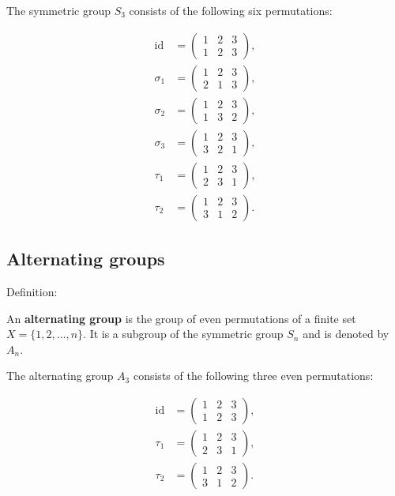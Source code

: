 \begin{example}
  The symmetric group $S_3$ consists of the following six permutations:

  \begin{align*}
    \text{id} &= \begin{pmatrix} 1 & 2 & 3 \\ 1 & 2 & 3 \end{pmatrix}, \\
    \sigma_1 &= \begin{pmatrix} 1 & 2 & 3 \\ 2 & 1 & 3 \end{pmatrix}, \\
    \sigma_2 &= \begin{pmatrix} 1 & 2 & 3 \\ 1 & 3 & 2 \end{pmatrix}, \\
    \sigma_3 &= \begin{pmatrix} 1 & 2 & 3 \\ 3 & 2 & 1 \end{pmatrix}, \\
    \tau_1 &= \begin{pmatrix} 1 & 2 & 3 \\ 2 & 3 & 1 \end{pmatrix}, \\
    \tau_2 &= \begin{pmatrix} 1 & 2 & 3 \\ 3 & 1 & 2 \end{pmatrix}.
  \end{align*}
\end{example}

\subsection{Alternating groups}

Definition:

  An \textbf{alternating group} is the group of even permutations of a finite set $X = \{1, 2, \dots, n\}$. It is a subgroup of the symmetric group $S_n$ and is denoted by $A_n$.

\begin{example}
  The alternating group $A_3$ consists of the following three even permutations:

  \begin{align*}
    \text{id} &= \begin{pmatrix} 1 & 2 & 3 \\ 1 & 2 & 3 \end{pmatrix}, \\
    \tau_1 &= \begin{pmatrix} 1 & 2 & 3 \\ 2 & 3 & 1 \end{pmatrix}, \\
    \tau_2 &= \begin{pmatrix} 1 & 2 & 3 \\ 3 & 1 & 2 \end{pmatrix}.
  \end{align*}
\end{example}

